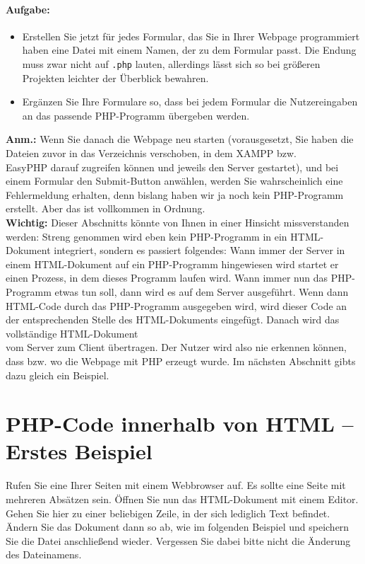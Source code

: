 \paragraph{Aufgabe:}

\begin{itemize}
	\item Erstellen Sie jetzt für jedes Formular, das Sie in Ihrer Webpage programmiert haben eine Datei mit einem Namen, der zu dem Formular passt. Die Endung muss zwar nicht auf \verb|.php| lauten, allerdings lässt sich so bei größeren Projekten leichter der Überblick bewahren.

	\item Ergänzen Sie Ihre Formulare so, dass bei jedem Formular die Nutzereingaben an das passende PHP-Programm übergeben werden.
\end{itemize}

\textbf{Anm.:} Wenn Sie danach die Webpage neu starten (vorausgesetzt, Sie haben die Dateien zuvor in das Verzeichnis verschoben, in dem XAMPP bzw. \\EasyPHP darauf zugreifen können und jeweils den Server gestartet), und bei einem Formular den Submit-Button anwählen, werden Sie wahrscheinlich eine Fehlermeldung erhalten, denn bislang haben wir ja noch kein PHP-Programm erstellt. Aber das ist vollkommen in Ordnung.\\

\textbf{Wichtig:} Dieser Abschnitts könnte von Ihnen in einer Hinsicht missverstanden werden: Streng genommen wird eben kein PHP-Programm in ein HTML-Dokument integriert, sondern es passiert folgendes: Wann immer der Server in einem HTML-Dokument auf ein PHP-Programm hingewiesen wird startet er einen Prozess, in dem dieses Programm laufen wird. Wann immer nun das PHP-Programm etwas tun soll, dann wird es auf dem Server ausgeführt. Wenn dann HTML-Code durch das PHP-Programm ausgegeben wird, wird dieser Code an der entsprechenden Stelle des HTML-Dokuments eingefügt. Danach wird das vollständige HTML-Dokument\\ vom Server zum Client übertragen. Der Nutzer wird also nie erkennen können, dass bzw. wo die Webpage mit PHP erzeugt wurde. Im nächsten Abschnitt gibts dazu gleich ein Beispiel.

\section{PHP-Code innerhalb von HTML – Erstes Beispiel}

Rufen Sie eine Ihrer Seiten mit einem Webbrowser auf. Es sollte eine Seite mit mehreren Absätzen sein. Öffnen Sie nun das HTML-Dokument mit einem Editor. Gehen Sie hier zu einer beliebigen Zeile, in der sich lediglich Text befindet. Ändern Sie das Dokument dann so ab, wie im folgenden Beispiel und speichern Sie die Datei anschließend wieder. Vergessen Sie dabei bitte nicht die Änderung des Dateinamens. \\

